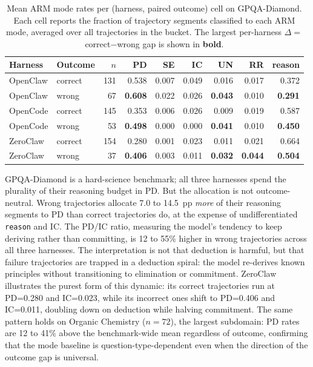 \begin{table}[t]
\centering
\caption{Mean ARM mode rates per (harness, paired outcome) cell on GPQA-Diamond. Each cell reports the fraction of trajectory segments classified to each ARM mode, averaged over all trajectories in the bucket. The largest per-harness $\Delta=$correct$-$wrong gap is shown in \textbf{bold}.}
\label{tab:arm-mode-rates}
\centering\fontsize{9}{9}\selectfont
\renewcommand{\arraystretch}{1.15}
\setlength{\tabcolsep}{2.5pt}
\begin{tabular}{llrrrrrrr}
\toprule
Harness & Outcome & $n$ & PD & SE & IC & UN & RR & reason \\
\midrule
OpenClaw & correct & 131 & 0.538 & 0.007 & 0.049 & 0.016 & 0.017 & 0.372 \\
OpenClaw & wrong   & 67  & \textbf{0.608} & 0.022 & 0.026 & \textbf{0.043} & 0.010 & \textbf{0.291} \\
\midrule
OpenCode & correct & 145 & 0.353 & 0.006 & 0.026 & 0.009 & 0.019 & 0.587 \\
OpenCode & wrong   & 53  & \textbf{0.498} & 0.000 & 0.000 & \textbf{0.041} & 0.010 & \textbf{0.450} \\
\midrule
ZeroClaw & correct & 154 & 0.280 & 0.001 & 0.023 & 0.011 & 0.021 & 0.664 \\
ZeroClaw & wrong   & 37  & \textbf{0.406} & 0.003 & 0.011 & \textbf{0.032} & \textbf{0.044} & \textbf{0.504} \\
\bottomrule
\end{tabular}
\end{table}


GPQA-Diamond is a hard-science benchmark; all three harnesses spend the plurality of their reasoning budget in PD. But the allocation is not outcome-neutral. Wrong trajectories allocate 7.0 to 14.5~pp \emph{more} of their reasoning segments to PD than correct trajectories do, at the expense of undifferentiated \texttt{reason} and IC. The PD/IC ratio, measuring the model's tendency to keep deriving rather than committing, is 12 to 55\% higher in wrong trajectories across all three harnesses. The interpretation is not that deduction is harmful, but that failure trajectories are trapped in a deduction spiral: the model re-derives known principles without transitioning to elimination or commitment. ZeroClaw illustrates the purest form of this dynamic: its correct trajectories run at PD=0.280 and IC=0.023, while its incorrect ones shift to PD=0.406 and IC=0.011, doubling down on deduction while halving commitment. The same pattern holds on Organic Chemistry ($n=72$), the largest subdomain: PD rates are 12 to 41\% above the benchmark-wide mean regardless of outcome, confirming that the mode baseline is question-type-dependent even when the direction of the outcome gap is universal.

